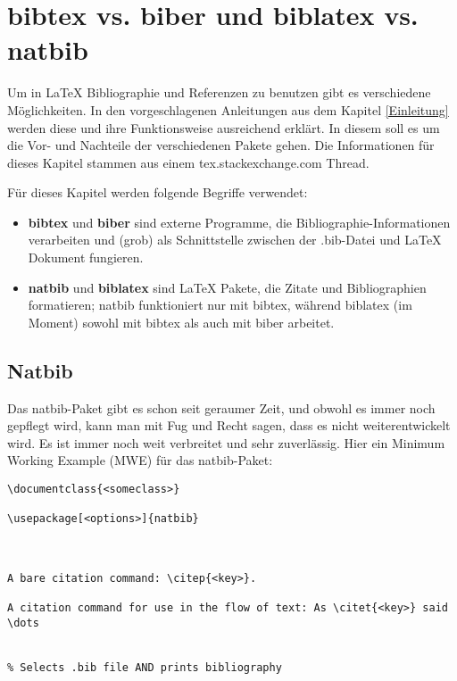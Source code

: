 \chapter{bibtex vs. biber und biblatex vs. natbib}
\label{bib}

Um in \LaTeX{} Bibliographie und Referenzen zu benutzen gibt es verschiedene Möglichkeiten. In den vorgeschlagenen Anleitungen aus dem Kapitel \ref{Einleitung} werden diese und ihre Funktionsweise ausreichend erklärt. In diesem soll es um die Vor- und Nachteile der verschiedenen Pakete gehen. Die Informationen für dieses Kapitel stammen aus einem tex.stackexchange.com Thread.\autocite{bibvsvbib}

Für dieses Kapitel werden folgende Begriffe verwendet:

\begin{itemize}
	\item \textbf{bibtex} und \textbf{biber} sind externe Programme, die Bibliographie-Informationen verarbeiten und (grob) als Schnittstelle zwischen der .bib-Datei und \LaTeX{} Dokument fungieren.
	\item \textbf{natbib} und \textbf{biblatex} sind \LaTeX{} Pakete, die Zitate und Bibliographien formatieren; natbib funktioniert nur mit bibtex, während biblatex (im Moment) sowohl mit bibtex als auch mit biber arbeitet.
\end{itemize}


\section{Natbib}
Das natbib-Paket gibt es schon seit geraumer Zeit, und obwohl es immer noch gepflegt wird, kann man mit Fug und Recht sagen, dass es nicht weiterentwickelt wird. Es ist immer noch weit verbreitet und sehr zuverlässig. Hier ein Minimum Working Example (MWE) für das natbib-Paket:

\begin{lstlisting}[style=LaTeX]
\documentclass{<someclass>}

\usepackage[<options>]{natbib}



A bare citation command: \citep{<key>}.

A citation command for use in the flow of text: As \citet{<key>} said \dots


% Selects .bib file AND prints bibliography


\end{lstlisting}

